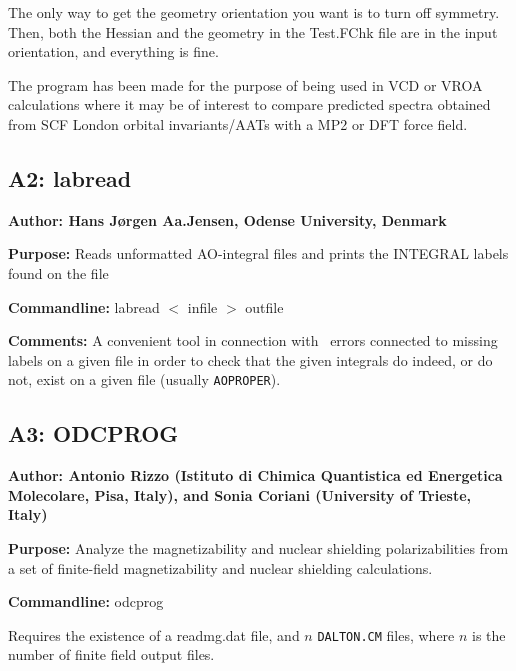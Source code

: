 The only way to get the geometry orientation you want is to turn
        off symmetry. 
        Then, both the Hessian and the geometry in the Test.FChk file are
        in the input orientation, and everything is fine.

The program has been made for the purpose of being used in VCD or
VROA 
calculations where it may be of interest to compare predicted spectra
obtained from SCF London orbital invariants/AATs with a MP2 or DFT force field.

\subsection*{A2: labread}

\noindent
{\large\bf Author: \normalsize\large Hans J\o rgen Aa.Jensen,
Odense University, Denmark}

\smallskip

\noindent 
{\bf Purpose:} Reads unformatted AO-integral files and prints the
INTEGRAL labels found on the file

\smallskip
\noindent
{\bf Commandline:} labread $<$ infile $>$ outfile

\smallskip
\noindent
{\bf Comments:}  A convenient tool in connection with \dalton\ errors
connected to missing labels on a given file in order to check that the
given integrals do indeed, or do not, exist on a given file (usually
\verb|AOPROPER|). 

\subsection*{A3: ODCPROG}

\noindent
{\large\bf Author: \normalsize\large Antonio Rizzo (Istituto di
Chimica Quantistica ed Energetica Molecolare, Pisa, Italy), and
Sonia Coriani (University of Trieste, Italy)}

\smallskip

\noindent 
{\bf Purpose:} Analyze the magnetizability and nuclear shielding
polarizabilities from a set of finite-field magnetizability and
nuclear shielding calculations.

\smallskip
\noindent
{\bf Commandline:} odcprog

Requires the existence of a readmg.dat file, and $n$ \verb|DALTON.CM| files,
where $n$ is the number of finite field output files.

